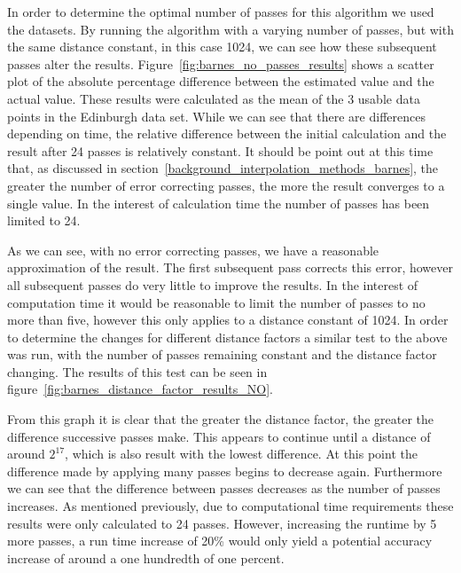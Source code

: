 
        	In order to determine the optimal number of passes for this algorithm we used the datasets. By running the algorithm with a varying number of passes, but with the same distance constant, in this case 1024, we can see how these subsequent passes alter the results. Figure~\ref{fig:barnes_no_passes_results} shows a scatter plot of the absolute percentage difference between the estimated value and the actual value. These results were calculated as the mean of the 3 usable data points in the Edinburgh data set. While we can see that there are differences depending on time, the relative difference between the initial calculation and the result after 24 passes is relatively constant. It should be point out at this time that, as discussed in section~\ref{background_interpolation_methods_barnes}, the greater the number of error correcting passes, the more the result converges to a single value. In the interest of calculation time the number of passes has been limited to 24. 

        	

        	As we can see, with no error correcting passes, we have a reasonable approximation of the result. The first subsequent pass corrects this error, however all subsequent passes do very little to improve the results. In the interest of computation time it would be reasonable to limit the number of passes to no more than five, however this only applies to a distance constant of 1024. In order to determine the changes for different distance factors a similar test to the above was run, with the number of passes remaining constant and the distance factor changing. The results of this test can be seen in figure~\ref{fig:barnes_distance_factor_results_NO}.


        	From this graph it is clear that the greater the distance factor, the greater the difference successive passes make. This appears to continue until a distance of around $2^{17}$, which is also result with the lowest difference. At this point the difference made by applying many passes begins to decrease again. Furthermore we can see that the difference between passes decreases as the number of passes increases. As mentioned previously, due to computational time requirements these results were only calculated to 24 passes. However, increasing the runtime by 5 more passes, a run time increase of 20\% would only yield a potential accuracy increase of around a one hundredth of one percent. 

